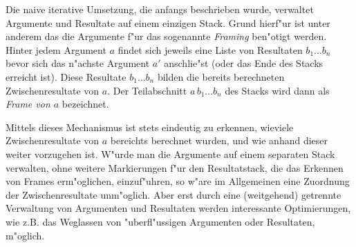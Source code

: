 \documentclass[12pt,a4paper]{article}
\begin{document}
Die naive iterative Umsetzung, die anfangs beschrieben wurde, verwaltet Argumente und Resultate auf einem einzigen
Stack. Grund hierf"ur ist unter anderem das die Argumente f"ur das sogenannte \emph{Framing} ben"otigt werden.
Hinter jedem Argument $a$ findet sich jeweils eine Liste von Resultaten $b_1 \ldots b_n$ bevor sich das n"achste
Argument $a'$ anschlie"st (oder das Ende des Stacks erreicht ist). Diese Resultate $b_1 \ldots b_n$ bilden die
bereits berechneten Zwischenresultate von $a$. Der Teilabschnitt $a\,b_1 \ldots b_n$ des Stacks wird dann als
\emph{Frame von $a$} bezeichnet.

Mittels dieses Mechanismus ist stets eindeutig zu erkennen, wieviele Zwischenresultate von $a$ bereichts
berechnet wurden, und wie anhand dieser weiter vorzugehen ist. W"urde man die Argumente auf einem separaten
Stack verwalten, ohne weitere Markierungen f"ur den Resultatstack, die das Erkennen von Frames erm"oglichen,
einzuf"uhren, so w"are im Allgemeinen eine Zuordnung der Zwischenresultate unm"oglich. Aber erst durch eine
(weitgehend) getrennte Verwaltung von Argumenten und Resultaten werden interessante Optimierungen, wie z.B.
das Weglassen von "uberfl"ussigen Argumenten oder Resultaten, m"oglich.
\end{document}
